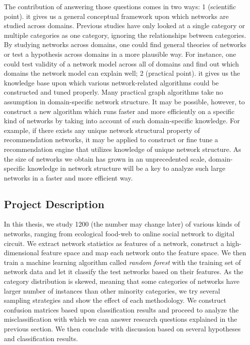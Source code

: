 \documentclass{article}
\begin{document}
The contribution of answering those questions comes in two ways: 1 (scientific point). it gives us a general conceptual framework upon which networks are studied across domains. Previous studies have only looked at a single category or multiple categories as one category, ignoring the relationships between categories. By studying networks across domains, one could find general theories of networks or test a hypothesis across domains in a more plausible way.  For instance, one could test validity of a network model across all of domains and find out which domains the network model can explain well; 2 (practical point). it gives us the knowledge base upon which various network-related algorithms could be constructed and tuned properly.  Many practical graph algorithms take no assumption in domain-specific network structure. It may be possible, however, to construct a new algorithm which runs faster and more efficiently on a specific kind of networks by taking into account of such domain-specific knowledge. For example, if there exists any unique network structural property of recommendation networks,  it may be applied to construct or fine tune a recommendation engine that utilizes knowledge of unique network structure. As the size of networks we obtain has grown in an unprecedented scale, domain-specific knowledge in network structure will be a key to analyze such large networks in a faster and more efficient way.

\subsection{Project Description}

In this thesis, we study 1200 (the number may change later) of various kinds of networks, ranging from ecological food-web to online social network to digital circuit. We extract network statistics as features of a network, construct a high-dimensional feature space and map each network onto the feature space. We then train a machine learning algorithm called \textit{random forest} with the training set of network data and let it classify the test networks based on their features. As the category distribution is skewed, meaning that some categories of networks have larger number of instances than other minority categories, we try several sampling strategies and show the effect of each methodology. We construct confusion matrices based upon classification results and proceed to analyze the misclassification with which we can answer research questions explained in the previous section. We then conclude with discussion based on several hypotheses and classification results.
\end{document}
